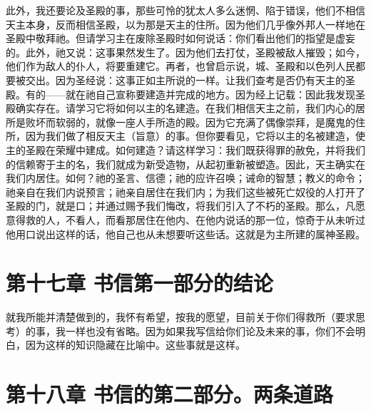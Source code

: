 此外，我还要论及圣殿的事，那些可怜的犹太人多么迷惘、陷于错误，他们不相信天主本身，反而相信圣殿，以为那是天主的住所。因为他们几乎像外邦人一样地在圣殿中敬拜祂。但请学习主在废除圣殿时如何说话：你们看出他们的指望是虚妄的。此外，祂又说：这事果然发生了。因为他们去打仗，圣殿被敌人摧毁；如今，他们作为敌人的仆人，将要重建它。再者，也曾启示说，城、圣殿和以色列人民都要被交出。因为圣经说：这事正如主所说的一样。让我们查考是否仍有天主的圣殿。有的——就在祂自己宣称要建造并完成的地方。因为经上记载：因此我发现圣殿确实存在。请学习它将如何以主的名建造。在我们相信天主之前，我们内心的居所是败坏而软弱的，就像一座人手所造的殿。因为它充满了偶像崇拜，是魔鬼的住所，因为我们做了相反天主（旨意）的事。但你要看见，它将以主的名被建造，使主的圣殿在荣耀中建成。如何建造？请这样学习：我们既获得罪的赦免，并将我们的信赖寄于主的名，我们就成为新受造物，从起初重新被塑造。因此，天主确实在我们内居住。如何？祂的圣言、信德；祂的应许召唤；诫命的智慧；教义的命令；祂亲自在我们内说预言；祂亲自居住在我们内；为我们这些被死亡奴役的人打开了圣殿的门，就是口；并通过赐予我们悔改，将我们引入了不朽的圣殿。那么，凡愿意得救的人，不看人，而看那居住在他内、在他内说话的那一位，惊奇于从未听过他用口说出这样的话，他自己也从未想要听这些话。这就是为主所建的属神圣殿。\par


\section{第十七章 书信第一部分的结论}

就我所能并清楚做到的，我怀有希望，按我的愿望，目前关于你们得救所（要求思考）的事，我一样也没有省略。因为如果我写信给你们论及未来的事，你们不会明白，因为这样的知识隐藏在比喻中。这些事就是这样。\par


\section{第十八章 书信的第二部分。两条道路}

